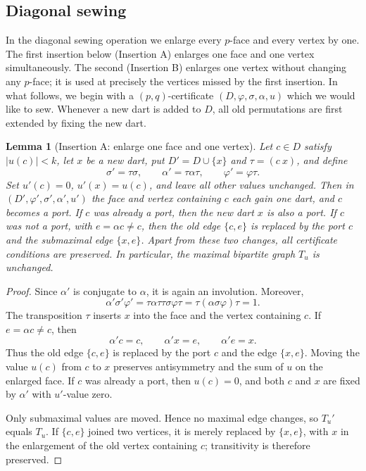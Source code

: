 \documentclass[11pt]{article}
\newtheorem{lemma}[theorem]{Lemma}
\theoremstyle{remark}
\begin{document}
\subsection{Diagonal sewing}

In the diagonal sewing operation we enlarge every $p$-face and every vertex by one.
The first insertion below (Insertion A) enlarges one face and one vertex simultaneously.
The second (Insertion B) enlarges one vertex without changing any $p$-face; it is
used at precisely the vertices missed by the first insertion. In what follows, we begin with a $(p,q)$-certificate $(D,\varphi,\sigma,\alpha,u)$ which we would like to sew. Whenever a new dart is added to $D$, all old permutations are first extended by fixing the new dart.

\begin{lemma}[Insertion A: enlarge one face and one vertex]\label{lem:typeA}
Let $c\in D$ satisfy $|u(c)|<k$, let $x$ be a new dart, put $D'=D\cup \{x\}$ and $\tau=(c\ x)$, and
define
\[
 \sigma'=\tau\sigma,\qquad
 \alpha'=\tau\alpha\tau,\qquad
 \varphi'=\varphi\tau.
\]
Set $u'(c)=0$, $u'(x)=u(c)$, and leave all other values unchanged.  Then in $(D',\varphi',\sigma',\alpha',u')$ the
face and vertex containing $c$ each gain one dart, and $c$ becomes a port.  If $c$ was already a port, then the new dart $x$ is also a port. If $c$ was not a port, with $e=\alpha c\neq c$, then the old edge $\{c,e\}$ is replaced by the port $c$ and the submaximal edge $\{x,e\}$.
Apart from these two changes, all certificate conditions are
preserved.  In particular, the maximal bipartite graph $T_u$ is unchanged.
\end{lemma}
\begin{proof}
Since $\alpha'$ is conjugate to $\alpha$, it is again an involution.  Moreover,
\[
 \alpha'\sigma'\varphi'
 =\tau\alpha\tau\tau\sigma\varphi\tau
 =\tau(\alpha\sigma\varphi)\tau=1.
\]
The transposition $\tau$ inserts $x$ into the face and the vertex containing
$c$.  If $e=\alpha c\ne c$, then
\[
       \alpha'c=c,\qquad \alpha'x=e,\qquad \alpha'e=x.
\]
Thus the old edge $\{c,e\}$ is replaced by the port $c$ and the edge
$\{x,e\}$.  Moving the value $u(c)$ from $c$ to $x$ preserves antisymmetry and
the sum of $u$ on the enlarged face.  If $c$ was already a port, then $u(c)=0$, and
both $c$ and $x$ are fixed by $\alpha'$ with $u'$-value zero.

Only submaximal values are moved.  Hence no maximal edge
changes, so $T_u'$ equals $T_u$. If $\{c,e\}$ joined two
vertices, it is merely replaced by $\{x,e\}$, with $x$ in the enlargement of
the old vertex containing $c$; transitivity is therefore preserved.
\end{proof}
\end{document}

